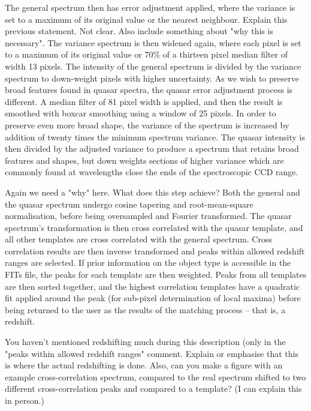 \documentclass[iop]{emulateapj}
\newcommand{\tam}{\color{blue}}
\newcommand{\tamcom}{\color{red}}
\begin{document}
The general spectrum then has error adjustment applied, where the variance is set to a maximum of its original value or the nearest neighbour. {\tamcom Explain this previous statement.  Not clear.   Also include something about "why this is necessary". }  The variance spectrum is then widened again, where each pixel is set to a maximum of its original value or 70\% of a thirteen pixel median filter of width 13 pixels. The intensity of the general spectrum is divided by the variance spectrum to down-weight pixels with higher uncertainty. As we wish to preserve broad features found in quasar spectra, the quasar error adjustment process is different. A median filter of 81 pixel width is applied, and then the result is smoothed with boxcar smoothing using a window of 25 pixels. In order to preserve even more broad shape, the variance of the spectrum is increased by addition of twenty times the minimum spectrum variance. The quasar intensity is then divided by the adjusted variance to produce a spectrum that retains broad features and shapes, but down weights sections of higher variance which are commonly found at wavelengths close the ends of the spectroscopic CCD range.

{\tamcom Again we need a "why" here.  What does this step achieve?}
Both the general and the quasar spectrum undergo cosine tapering and root-mean-square normalisation, before being oversampled and Fourier transformed. The quasar spectrum's transformation is then cross correlated with the quasar template, and all other templates are cross correlated with the general spectrum. Cross correlation results are then inverse transformed and peaks within allowed redshift ranges are selected. If prior information on the object type is accessible in the FITs file, the peaks for each template are then weighted. Peaks from all templates are then sorted together, and the highest {\tam correlation} templates have a quadratic fit applied around the peak (for sub-pixel determination of local maxima) before being returned to the user as the results of the matching process {\tam -- that is, a redshift.} 

{\tamcom You haven't mentioned redshifting much during this description (only in the "peaks within allowed redshift ranges" comment.  Explain or emphasise that this is where the actual redshifting is done.  Also, can you make a figure with an example cross-correlation spectrum, compared to the real spectrum shifted to two different cross-correlation peaks and compared to a template?  (I can explain this in person.)}
\end{document}
